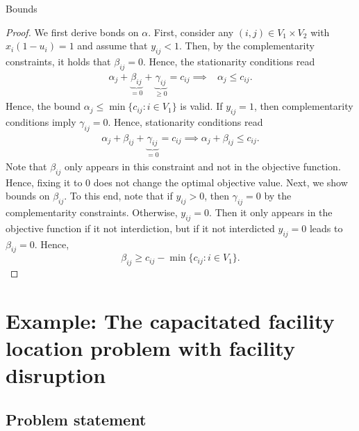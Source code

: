 \begin{proposition}
    Bounds
\end{proposition}
\begin{proof}
    We first derive bonds on $\alpha$. First, consider any $(i,j)\in V_1\times
    V_2$ with $x_i(1 - u_i) = 1$ and assume that $y_{ij} < 1$. Then, by the
    complementarity constraints, it holds that $\beta_{ij} = 0$. Hence, the
    stationarity conditions read
    \begin{align*}
        \alpha_j + \underbrace{\beta_{ij}}_{=0} + \underbrace{\gamma_{ij}}_{\ge 0} = c_{ij} 
        \implies 
        & \alpha_j \le c_{ij}.
    \end{align*}
    Hence, the bound $\alpha_j \le \min\{ c_{ij} : i\in V_1 \}$ is valid. {\color{red}If
    $y_{ij} = 1$, then complementarity conditions imply $\gamma_{ij} = 0$.
    Hence, stationarity conditions read 
    \begin{align*}
        \alpha_j + \beta_{ij} + \underbrace{\gamma_{ij}}_{=0} = c_{ij}
        \implies
        \alpha_j + \beta_{ij} \le c_{ij}.
    \end{align*}
    Note that $\beta_{ij}$ only appears in this constraint and not in the
    objective function. Hence, fixing it to $0$ does not change the optimal
    objective value.} Next, we show bounds on $\beta_{ij}$. To this end, note
    that if $y_{ij} > 0$, then $\gamma_{ij} = 0$ by the complementarity
    constraints.  Otherwise, $y_{ij} = 0$. Then it only appears in the
    objective function if it not interdiction, but if it not interdicted
    $y_{ij} = 0$ leads to $\beta_{ij} = 0$. Hence,
    \begin{equation*}
        \beta_{ij} \ge c_{ij} - \min\{ c_{ij} : i\in V_1 \}.
    \end{equation*}
\end{proof}

\newpage

\section{Example: The capacitated facility location problem with facility disruption}

\subsection{Problem statement}

